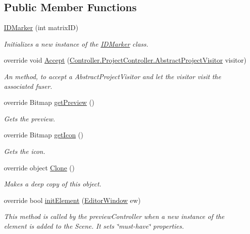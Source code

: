 \subsection*{Public Member Functions}
\begin{DoxyCompactItemize}
\item 
\hyperlink{class_a_rdev_kit_1_1_model_1_1_project_1_1_i_d_marker_a7fe99aaa5d8dc1fa71bcd8796702928c}{I\-D\-Marker} (int matrix\-I\-D)
\begin{DoxyCompactList}\small\item\em Initializes a new instance of the \hyperlink{class_a_rdev_kit_1_1_model_1_1_project_1_1_i_d_marker}{I\-D\-Marker} class. \end{DoxyCompactList}\item 
override void \hyperlink{class_a_rdev_kit_1_1_model_1_1_project_1_1_i_d_marker_a48c59c173c58ba20bff0594587b85182}{Accept} (\hyperlink{class_a_rdev_kit_1_1_controller_1_1_project_controller_1_1_abstract_project_visitor}{Controller.\-Project\-Controller.\-Abstract\-Project\-Visitor} visitor)
\begin{DoxyCompactList}\small\item\em An method, to accept a Abstract\-Project\-Visitor and let the visitor visit the associated fuser. \end{DoxyCompactList}\item 
override Bitmap \hyperlink{class_a_rdev_kit_1_1_model_1_1_project_1_1_i_d_marker_a4533a46611ee75747a5cf96f3fc2586c}{get\-Preview} ()
\begin{DoxyCompactList}\small\item\em Gets the preview. \end{DoxyCompactList}\item 
override Bitmap \hyperlink{class_a_rdev_kit_1_1_model_1_1_project_1_1_i_d_marker_ae3713212fbac546d841e3be2ccb43db9}{get\-Icon} ()
\begin{DoxyCompactList}\small\item\em Gets the icon. \end{DoxyCompactList}\item 
override object \hyperlink{class_a_rdev_kit_1_1_model_1_1_project_1_1_i_d_marker_a69480e66c9a3755dfb94bb7b957c18d8}{Clone} ()
\begin{DoxyCompactList}\small\item\em Makes a deep copy of this object. \end{DoxyCompactList}\item 
override bool \hyperlink{class_a_rdev_kit_1_1_model_1_1_project_1_1_i_d_marker_a30b191b81b928fbe6397d8136e31baea}{init\-Element} (\hyperlink{class_a_rdev_kit_1_1_editor_window}{Editor\-Window} ew)
\begin{DoxyCompactList}\small\item\em This method is called by the preview\-Controller when a new instance of the element is added to the Scene. It sets \char`\"{}must-\/have\char`\"{} properties. \end{DoxyCompactList}\end{DoxyCompactItemize}
